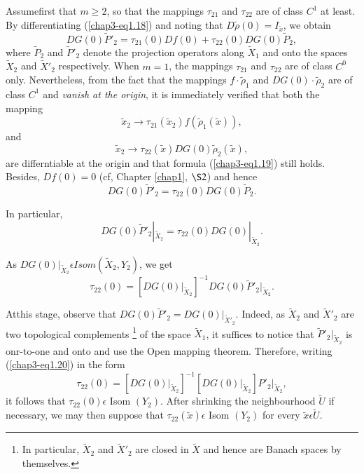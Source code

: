Assume\pageoriginale first that $m \geq 2$, so that the mappings
$\tau_{21}$ and $\tau_{22}$ are of class $C^{1}$ at least. By
differentiating (\ref{chap3-eq1.18}) and noting that
$D\widetilde{\rho}(0) = I_{\widetilde{x}}$, we obtain
\begin{equation*}
DG(0) \widetilde{P}'_{2} = \tau_{21}(0) Df(0) + \tau_{22}(0) DG(0)
\widetilde{P}_{2},\tag{1.19}\label{chap3-eq1.19} 
\end{equation*}
where $\widetilde{P}_{2}$ and $\widetilde{P}'_{2}$ denote the
projection operators along $\widetilde{X}_{1}$ and onto the spaces
$\widetilde{X}_{2}$ and $\widetilde{X}'_{2}$ respectively. When $m =
1$, the mappings $\tau_{21}$ and $\tau_{22}$ are of class $C^{0}$
only. Nevertheless, from the fact that the mappings $f \cdot
\widetilde{\rho}_{1}$ and $DG(0) \cdot \widetilde{\rho}_{2}$ are of
class $C^{1}$ and {\em vanish at the origin}, it is immediately
verified that both the mapping
$$
\widetilde{x}_{2} \to \tau_{21}(\widetilde{x}_{2})
f(\widetilde{\rho}_{1} (\widetilde{x})),
$$
and
$$
\widetilde{x}_{2} \to \tau_{22}(\widetilde{x}) DG(0) \widetilde{\rho}_{2}(\widetilde{x}),
$$
are differntiable at the origin and that formula (\ref{chap3-eq1.19})
still holds. Besides, $Df(0) = 0$ (cf, Chapter \ref{chap1}, $\S 2$)
and hence
$$
DG(0) \widetilde{P}'_{2} = \tau_{22}(0) DG(0) \widetilde{P}_{2}.
$$

In particular,
$$
DG(0) \widetilde{P}'_{2} |_{\widetilde{X}_{2}} = \tau_{22}(0) DG(0)
|_{\widetilde{X}_{2}}. 
$$

As $DG(0)|_{\widetilde{X}_{2}} \epsilon Isom (\widetilde{X}_{2},
Y_{2})$, we get
\begin{equation*}
\tau_{22}(0) = \left[DG(0) |_{\widetilde{X}_{2}}\right]^{-1} DG(0)
\widetilde{P}'_{2} |_{\widetilde{X}_{2}}.\tag{1.20}\label{chap3-eq1.20}
\end{equation*}

At\pageoriginale this stage, observe that $DG(0) \widetilde{P}'_{2} =
DG(0) |_{\widetilde{X}'_{2}}$. Indeed, as $\widetilde{X}_{2}$ and
$\widetilde{X}'_{2}$ are two topological complements \footnote{In
  particular, $\widetilde{X}_{2}$ and $\widetilde{X}'_{2}$ are closed
  in $\widetilde{X}$ and hence are Banach spaces by themselves.} of
the space $\widetilde{X}_{1}$, it suffices to notice that
$\widetilde{P}'_{2} |_{\widetilde{X}_{2}}$ is onr-to-one and onto and
use the Open mapping theorem. Therefore, writing (\ref{chap3-eq1.20})
in the form
$$
\tau_{22}(0) = \left[DG(0) |_{\widetilde{X}_{2}}\right]^{-1}
\left[DG(0) |_{\widetilde{X}_{2}}\right] P'_{2} |_{\widetilde{X}_{2}},
$$
it follows that $\tau_{22}(0) \epsilon$ Isom  $(Y_{2})$. After
shrinking the neighbourhood $\widetilde{U}$ if necessary, we may then
suppose that $\tau_{22}(\widetilde{x}) \epsilon$ Isom $(Y_{2})$ for
every $\widetilde{x} \epsilon \widetilde{U}$.

